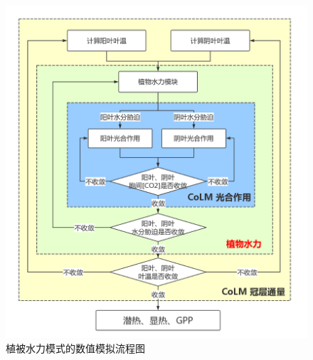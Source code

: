 {
    \begin{figure}[htbp]
    \centering
    \includegraphics{Figures/植被水力模式/植被水力模式的数值模拟流程图.png}
    \caption{植被水力模式的数值模拟流程图}
    \label{fig:植被水力模式的数值模拟流程图}
    \end{figure}
}

